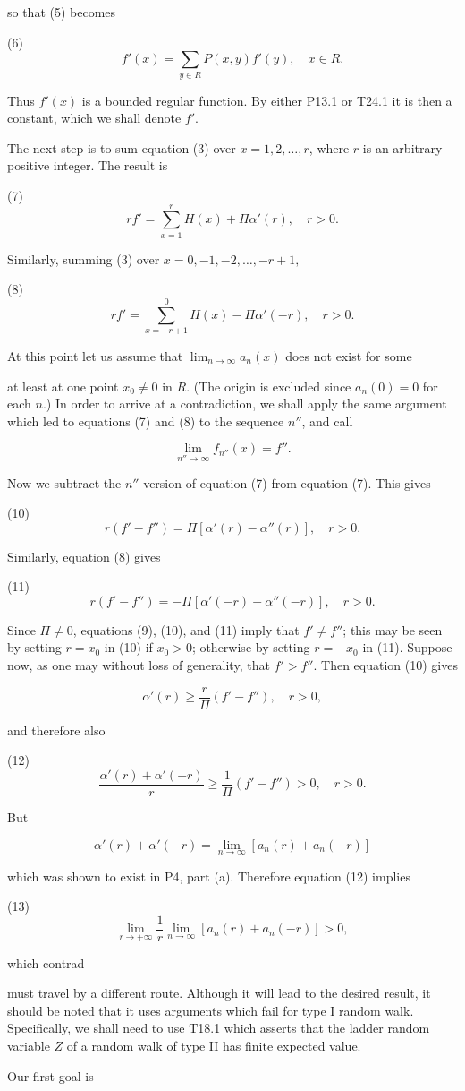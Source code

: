 so that (5) becomes

(6) $$f'(x) = \sum_{y \in R} P(x,y)f'(y), \quad x \in R.$$

Thus $f'(x)$ is a bounded regular function. By either P13.1 or T24.1 it is then a constant, which we shall denote $f'$.

The next step is to sum equation (3) over $x = 1, 2, \ldots, r$, where $r$ is an arbitrary positive integer. The result is

(7) $$rf' = \sum_{x=1}^{r} H(x) + \Pi\alpha'(r), \quad r > 0.$$

Similarly, summing (3) over $x = 0, -1, -2, \ldots, -r + 1,$

(8) $$rf' = \sum_{x=-r+1}^{0} H(x) - \Pi\alpha'(-r), \quad r > 0.$$

At this point let us assume that $\lim_{n \to \infty} a_n(x)$ does not exist for some

at least at one point $x_0 \neq 0$ in $R$. (The origin is excluded since $a_n(0) = 0$ for each $n$.) In order to arrive at a contradiction, we shall apply the same argument which led to equations (7) and (8) to the sequence $n''$, and call

$$\lim_{n'' \to \infty} f_{n''}(x) = f''.$$

Now we subtract the $n''$-version of equation (7) from equation (7). This gives

(10) $$r(f' - f'') = \Pi[\alpha'(r) - \alpha''(r)], \quad r > 0.$$

Similarly, equation (8) gives

(11) $$r(f' - f'') = -\Pi[\alpha'(-r) - \alpha''(-r)], \quad r > 0.$$

Since $\Pi \neq 0$, equations (9), (10), and (11) imply that $f' \neq f''$; this may be seen by setting $r = x_0$ in (10) if $x_0 > 0$; otherwise by setting $r = -x_0$ in (11). Suppose now, as one may without loss of generality, that $f' > f''$. Then equation (10) gives

$$\alpha'(r) \geq \frac{r}{\Pi}(f' - f''), \quad r > 0,$$

and therefore also

(12) $$\frac{\alpha'(r) + \alpha'(-r)}{r} \geq \frac{1}{\Pi}(f' - f'') > 0, \quad r > 0.$$

But

$$\alpha'(r) + \alpha'(-r) = \lim_{n \to \infty}[a_n(r) + a_n(-r)]$$

which was shown to exist in P4, part (a). Therefore equation (12) implies

(13) $$\lim_{r \to +\infty} \frac{1}{r} \lim_{n \to \infty}[a_n(r) + a_n(-r)] > 0,$$

which contrad

must travel by a different route. Although it will lead to the desired result, it should be noted that it uses arguments which fail for type I random walk. Specifically, we shall need to use T18.1 which asserts that the ladder random variable $Z$ of a random walk of type II has finite expected value.

Our first goal is